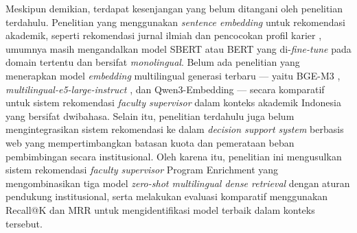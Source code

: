 Meskipun demikian, terdapat kesenjangan yang belum ditangani oleh penelitian terdahulu. Penelitian yang menggunakan \textit{sentence embedding} untuk rekomendasi akademik, seperti rekomendasi jurnal ilmiah \cite{gundogan2023journal} dan pencocokan profil karier \cite{rosenberger2025careerbert}, umumnya masih mengandalkan model SBERT atau BERT yang di-\textit{fine-tune} pada domain tertentu dan bersifat \textit{monolingual}. Belum ada penelitian yang menerapkan model \textit{embedding} multilingual generasi terbaru --- yaitu BGE-M3 \cite{chen2024bgem3}, \textit{multilingual-e5-large-instruct} \cite{wang2024e5}, dan Qwen3-Embedding \cite{qwen3embedding} --- secara komparatif untuk sistem rekomendasi \textit{faculty supervisor} dalam konteks akademik Indonesia yang bersifat dwibahasa. Selain itu, penelitian terdahulu juga belum mengintegrasikan sistem rekomendasi ke dalam \textit{decision support system} berbasis web yang mempertimbangkan batasan kuota dan pemerataan beban pembimbingan secara institusional. Oleh karena itu, penelitian ini mengusulkan sistem rekomendasi \textit{faculty supervisor} Program Enrichment yang mengombinasikan tiga model \textit{zero-shot multilingual dense retrieval} dengan aturan pendukung institusional, serta melakukan evaluasi komparatif menggunakan Recall@K dan MRR untuk mengidentifikasi model terbaik dalam konteks tersebut.


